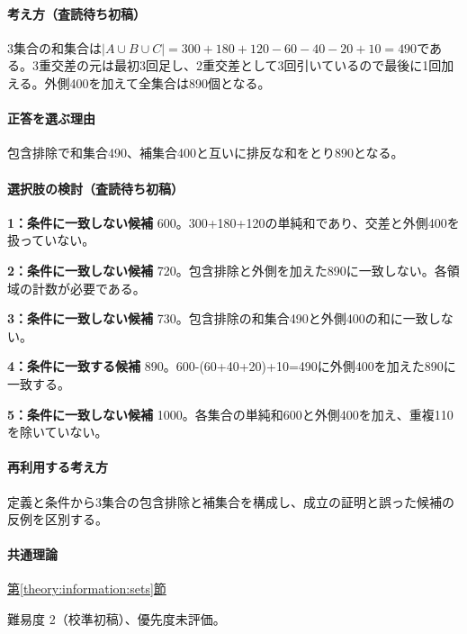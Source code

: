 \paragraph{考え方（査読待ち初稿）} 3集合の和集合は\(|A\cup B\cup C|=300+180+120-60-40-20+10=490\)である。3重交差の元は最初3回足し、2重交差として3回引いているので最後に1回加える。外側400を加えて全集合は890個となる。

\paragraph{正答を選ぶ理由} 包含排除で和集合490、補集合400と互いに排反な和をとり890となる。

\paragraph{選択肢の検討（査読待ち初稿）}\mbox{}\par

\noindent\textbf{1：条件に一致しない候補} 600。300+180+120の単純和であり、交差と外側400を扱っていない。\par

\noindent\textbf{2：条件に一致しない候補} 720。包含排除と外側を加えた890に一致しない。各領域の計数が必要である。\par

\noindent\textbf{3：条件に一致しない候補} 730。包含排除の和集合490と外側400の和に一致しない。\par

\noindent\textbf{4：条件に一致する候補} 890。600-(60+40+20)+10=\allowbreak{}490に外側400を加えた890に一致する。\par

\noindent\textbf{5：条件に一致しない候補} 1000。各集合の単純和600と外側400を加え、重複110を除いていない。\par

\paragraph{再利用する考え方} 定義と条件から3集合の包含排除と補集合を構成し、成立の証明と誤った候補の反例を区別する。

\paragraph{共通理論} \hyperref[theory:information:sets]{第\ref*{theory:information:sets}節}

\par 難易度 2（校準初稿）、優先度未評価。

